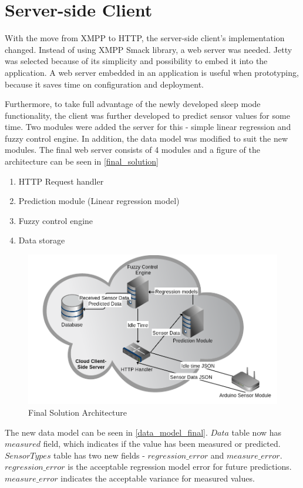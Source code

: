 \section{Server-side Client}

With the move from XMPP to HTTP, the server-side client's implementation changed. Instead of using XMPP Smack library, a web server was needed. Jetty was selected because of its simplicity and possibility to embed it into the application. A web server embedded in an application is useful when prototyping, because it saves time on configuration and deployment. 

Furthermore, to take full advantage of the newly developed sleep mode functionality, the client was further developed to predict sensor values for some time. Two modules were added the server for this - simple linear regression and fuzzy control engine. In addition, the data model was modified to suit the new modules. The final web server consists of 4 modules and a figure of the architecture can be seen in \autoref{final_solution}

\begin{enumerate}
\item HTTP Request handler
\item Prediction module (Linear regression model)
\item Fuzzy control engine
\item Data storage
\end{enumerate}

\begin{figure}[h!]
\centering
\includegraphics[scale=0.46]{4/figures/finalsolution.png}
\caption{Final Solution Architecture}
\label{final_solution}
\end{figure}

The new data model can be seen in \autoref{data_model_final}. $Data$ table now has $measured$ field, which indicates if the value has been measured or predicted. $SensorTypes$ table has two new fields - $regression\_error$ and $measure\_error$. $regression\_error$ is the acceptable regression model error for future predictions. $measure\_error$ indicates the acceptable variance for measured values. 

